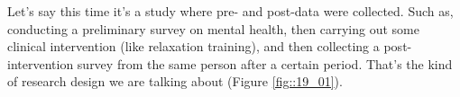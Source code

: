 \documentclass{ltjsarticle}
\begin{document}
Let's say this time it's a study where pre- and post-data were collected. Such as, conducting a preliminary survey on mental health, then carrying out some clinical intervention (like relaxation training), and then collecting a post-intervention survey from the same person after a certain period. That's the kind of research design we are talking about (Figure \ref{fig::19_01}).



\end{document}
